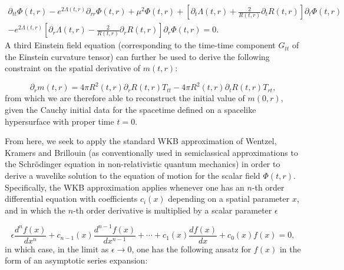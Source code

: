 \documentclass{article}
\begin{document}
\begin{multline}
\partial_{t t} \Phi \left( t, r \right) - e^{2 \Lambda \left( t, r \right)} \partial_{r r} \Phi \left( t, r \right) + \mu^2 \Phi \left( t, r \right) + \left[ \partial_t \Lambda \left( t, r \right) + \frac{2}{R \left( t, r \right)} \partial_t R \left( t, r \right) \right] \partial_t \Phi \left( t, r \right)\\
- e^{2 \Lambda \left( t, r \right)} \left[ \partial_r \Lambda \left( t, r \right) - \frac{2}{R \left( t, r \right)} \partial_r R \left( t, r \right) \right] \partial_r \Phi \left( t, r \right) = 0.
\end{multline}
A third Einstein field equation (corresponding to the time-time component ${G_{t t}}$ of the Einstein curvature tensor) can further be used to derive the following constraint on the spatial derivative of ${m \left( t, r \right)}$:

\begin{equation}
\partial_r m \left( t, r \right) = 4 \pi R^2 \left( t, r \right) \partial_r R \left( t, r \right) T_{t t} - 4 \pi R^2 \left( t, r \right) \partial_t R \left( t, r \right) T_{r t},
\end{equation}
from which we are therefore able to reconstruct the initial value of ${m \left( 0, r \right)}$, given the Cauchy initial data for the spacetime defined on a spacelike hypersurface with proper time ${t = 0}$.

From here, we seek to apply the standard WKB approximation of Wentzel, Kramers and Brillouin\cite{wentzel}\cite{kramers}\cite{brillouin} (as conventionally used in semiclassical approximations to the Schr\"odinger equation in non-relativistic quantum mechanics) in order to derive a wavelike solution to the equation of motion for the scalar field ${\Phi \left( t, r \right)}$. Specifically, the WKB approximation applies whenever one has an $n$-th order differential equation with coefficients ${c_i \left( x \right)}$ depending on a spatial parameter $x$, and in which the $n$-th order derivative is multiplied by a scalar parameter ${\epsilon}$

\begin{equation}
\epsilon \frac{d^n f \left( x \right)}{d x^n} + c_{n - 1} \left( x \right) \frac{d^{n - 1} f \left( x \right)}{d x^{n - 1}} + \cdots + c_{1} \left( x \right) \frac{d f \left( x \right)}{dx} + c_{0} \left( x \right) f \left( x \right) = 0,
\end{equation}
in which case, in the limit as ${\epsilon \to 0}$, one has the following ansatz for ${f \left( x \right)}$ in the form of an asymptotic series expansion:
\end{document}
